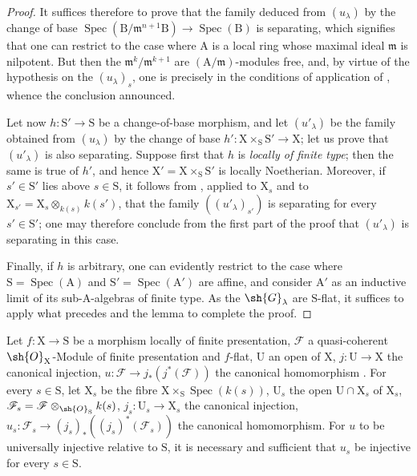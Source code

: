\begin{proof}
It suffices therefore to prove that the family deduced from $(u_\lambda)$ by the change of base $\operatorname{Spec}(\mathrm{B}/\mathfrak{m}^{n+1}\mathrm{B})\to\operatorname{Spec}(\mathrm{B})$ is separating, which signifies that one can restrict to the case where $\mathrm{A}$ is a local ring whose maximal ideal $\mathfrak{m}$ is nilpotent.
But then the $\mathfrak{m}^k/\mathfrak{m}^{k+1}$ are $(\mathrm{A}/\mathfrak{m})$-modules free, and, by virtue of the hypothesis on the $(u_\lambda)_s$, one is precisely in the conditions of application of , whence the conclusion announced.

Let now $h:\mathrm{S}'\to\mathrm{S}$ be a change-of-base morphism, and let $(u'_\lambda)$ be the family obtained from $(u_\lambda)$ by the change of base $h':\mathrm{X}\times_\mathrm{S}\mathrm{S}'\to\mathrm{X}$; let us prove that $(u'_\lambda)$ is also separating.
Suppose first that $h$ is \emph{locally of finite type}; then the same is true of $h'$, and hence $\mathrm{X}'=\mathrm{X}\times_\mathrm{S}\mathrm{S}'$ is locally Noetherian. Moreover, if $s'\in\mathrm{S}'$ lies above $s\in\mathrm{S}$, it follows from , applied to $\mathrm{X}_s$ and to $\mathrm{X}_{s'}=\mathrm{X}_s\otimes_{k(s)}k(s')$, that the family $((u'_\lambda)_{s'})$ is separating for every $s'\in\mathrm{S}'$; one may therefore conclude from the first part of the proof that $(u'_\lambda)$ is separating in this case.

Finally, if $h$ is arbitrary, one can evidently restrict to the case where $\mathrm{S}=\operatorname{Spec}(\mathrm{A})$ and $\mathrm{S}'=\operatorname{Spec}(\mathrm{A}')$ are affine, and consider $\mathrm{A}'$ as an inductive limit of its sub-$\mathrm{A}$-algebras of finite type.
As the $\sh{G}_\lambda$ are $\mathrm{S}$-flat, it suffices to apply what precedes and the lemma  to complete the proof.
\end{proof}

\begin{proposition}[11.9.17]
\label{IV.11.9.17}
Let $f:\mathrm{X}\to\mathrm{S}$ be a morphism locally of finite presentation, $\mathscr{F}$ a quasi-coherent $\sh{O}_\mathrm{X}$-Module of finite presentation and $f$-flat, $\mathrm{U}$ an open of $\mathrm{X}$, $j:\mathrm{U}\to\mathrm{X}$ the canonical injection, $u:\mathscr{F}\to j_*(j^*(\mathscr{F}))$ the canonical homomorphism .
For every $s\in\mathrm{S}$, let $\mathrm{X}_s$ be the fibre $\mathrm{X}\times_\mathrm{S}\operatorname{Spec}(k(s))$, $\mathrm{U}_s$ the open $\mathrm{U}\cap\mathrm{X}_s$ of $\mathrm{X}_s$, $\mathscr{F}_s=\mathscr{F}\otimes_{\sh{O}_\mathrm{S}}k(s)$, $j_s:\mathrm{U}_s\to\mathrm{X}_s$ the canonical injection, $u_s:\mathscr{F}_s\to(j_s)_*((j_s)^*(\mathscr{F}_s))$ the canonical homomorphism.
For $u$ to be universally injective relative to $\mathrm{S}$, it is necessary and sufficient that $u_s$ be injective for every $s\in\mathrm{S}$.
\end{proposition}

